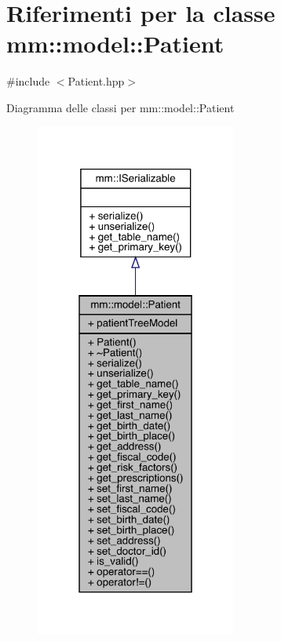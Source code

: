 \hypertarget{classmm_1_1model_1_1_patient}{}\section{Riferimenti per la classe mm\+:\+:model\+:\+:Patient}
\label{classmm_1_1model_1_1_patient}


{\ttfamily \#include $<$Patient.\+hpp$>$}



Diagramma delle classi per mm\+:\+:model\+:\+:Patient
\nopagebreak
\begin{figure}[H]
\begin{center}
\leavevmode
\includegraphics[width=187pt]{d0/d42/classmm_1_1model_1_1_patient__inherit__graph}
\end{center}
\end{figure}


